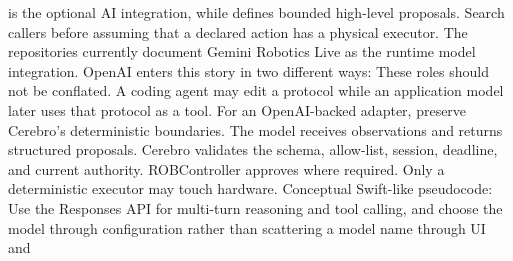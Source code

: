 {}\markdownRendererInterblockSeparator
{}\markdownRendererThematicBreak{}\markdownRendererInterblockSeparator
{}
\markdownRendererSectionEnd \markdownRendererSectionBegin
{}\markdownRendererInterblockSeparator
{}\markdownRendererBlockQuoteBegin
{}  is the optional AI integration, while  defines bounded high-level proposals. Search callers before assuming that a declared action has a physical executor.\markdownRendererBlockQuoteEnd \markdownRendererInterblockSeparator
{}The repositories currently document Gemini Robotics Live as the runtime model\markdownRendererSoftLineBreak
{}integration. OpenAI enters this story in two different ways:\markdownRendererInterblockSeparator
{}\markdownRendererOlBegin
{}\markdownRendererOlItemEnd 
{}\markdownRendererOlItemEnd 
\markdownRendererOlEnd \markdownRendererInterblockSeparator
{}These roles should not be conflated. A coding agent may edit a protocol while\markdownRendererSoftLineBreak
{}an application model later uses that protocol as a tool.\markdownRendererParagraphSeparator
{}For an OpenAI-backed adapter, preserve Cerebro's deterministic boundaries. The\markdownRendererSoftLineBreak
{}model receives observations and returns structured proposals. Cerebro validates\markdownRendererSoftLineBreak
{}the schema, allow-list, session, deadline, and current authority. ROBController\markdownRendererSoftLineBreak
{}approves where required. Only a deterministic executor may touch hardware.\markdownRendererParagraphSeparator
{}Conceptual Swift-like pseudocode:\markdownRendererInterblockSeparator
{}\markdownRendererInterblockSeparator
{}Use the Responses API for multi-turn reasoning and tool calling, and choose the\markdownRendererSoftLineBreak
{}model through configuration rather than scattering a model name through UI and\markdownRendererSoftLineBreak
